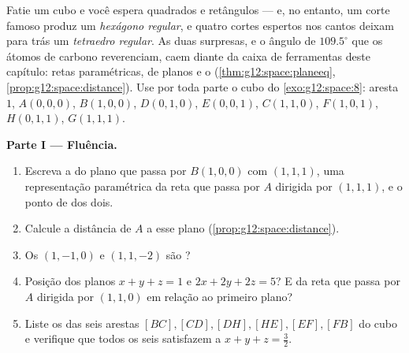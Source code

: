 \begin{problem}
\label{pb:g12:space:1}
Fatie um cubo e você espera quadrados e retângulos --- e, no
entanto, um corte famoso produz um \emph{hexágono regular}, e
quatro cortes espertos nos cantos deixam para trás um
\emph{tetraedro regular}. As duas surpresas, e o ângulo de
$109.5^\circ$ que os átomos de carbono reverenciam, caem diante
da caixa de ferramentas deste capítulo: retas paramétricas,
 de planos e o 
(\cref{thm:g12:space:planeeq},
\cref{prop:g12:space:distance}). Use por toda parte o cubo do
\cref{exo:g12:space:8}: aresta $1$, $A(0,0,0)$, $B(1,0,0)$,
$D(0,1,0)$, $E(0,0,1)$, $C(1,1,0)$, $F(1,0,1)$, $H(0,1,1)$,
$G(1,1,1)$.

\medskip
\noindent\textbf{Parte I --- Fluência.}
\begin{enumerate}
  \item Escreva a  do plano que passa por $B(1,0,0)$ com
         $(1,1,1)$, uma representação paramétrica da
        reta que passa por $A$ dirigida por $(1,1,1)$, e o ponto
        de  dos dois.
  \item Calcule a distância de $A$ a esse plano
        (\cref{prop:g12:space:distance}).
  \item Os  $(1,-1,0)$ e $(1,1,-2)$ são ?
  \item Posição dos planos $x + y + z = 1$ e
        $2x + 2y + 2z = 5$? E da reta que passa por $A$ dirigida
        por $(1,1,0)$ em relação ao primeiro plano?
  \item Liste os  das seis arestas
        $[BC], [CD], [DH], [HE], [EF], [FB]$ do cubo e
        verifique que todos os seis satisfazem a 
        $x + y + z = \frac32$.
\end{enumerate}


\end{problem}
